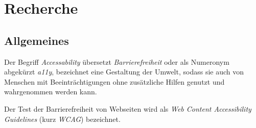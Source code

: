 \chapter{Recherche}

\label{Chapter2}

\section{Allgemeines}

Der Begriff \emph{Accessability} übersetzt \emph{Barrierefreiheit} oder als Numeronym abgekürzt \emph{a11y}, bezeichnet eine Gestaltung der Umwelt, sodass sie auch von Menschen mit Beeinträchtigungen ohne zusätzliche Hilfen genutzt und wahrgenommen werden kann. \cite{Bundesfachstelle_Barrierefreiheit_a11y_Definition}

Der Test der Barrierefreiheit von Webseiten wird als \emph{Web Content Accessibility Guidelines} (kurz \emph{WCAG}) bezeichnet.
